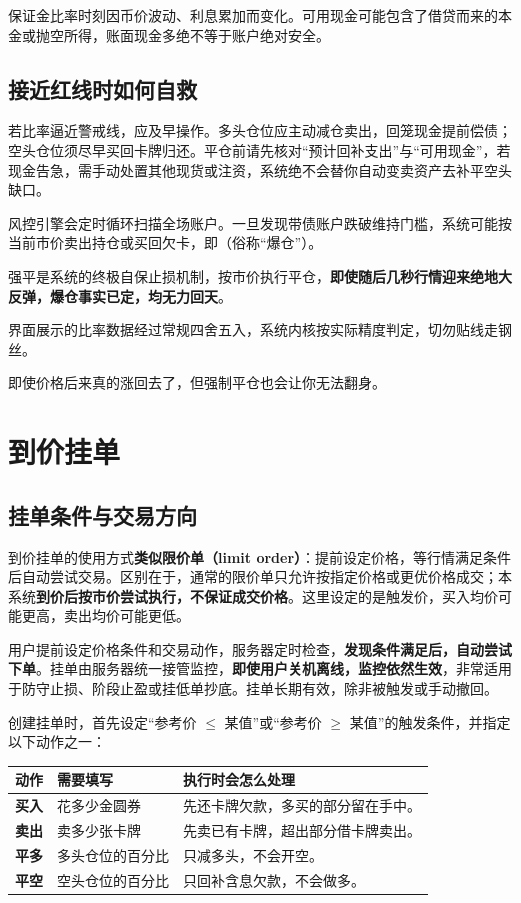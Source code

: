 \documentclass[11pt,a4paper,twoside]{article}
\newcommand{\gold}{金圆券}
\begin{document}
保证金比率时刻因币价波动、利息累加而变化。可用现金可能包含了借贷而来的本金或抛空所得，账面现金多绝不等于账户绝对安全。

\subsection{接近红线时如何自救}

若比率逼近警戒线，应及早操作。多头仓位应主动减仓卖出，回笼现金提前偿债；空头仓位须尽早买回卡牌归还。平仓前请先核对“预计回补支出”与“可用现金”，若现金告急，需手动处置其他现货或注资，系统绝不会替你自动变卖资产去补平空头缺口。

风控引擎会定时循环扫描全场账户。一旦发现带债账户跌破维持门槛，系统可能按当前市价卖出持仓或买回欠卡，即（俗称“爆仓”）。

强平是系统的终极自保止损机制，按市价执行平仓，\textbf{即使随后几秒行情迎来绝地大反弹，爆仓事实已定，均无力回天}。

界面展示的比率数据经过常规四舍五入，系统内核按实际精度判定，切勿贴线走钢丝。

\begin{lorebox}
即使价格后来真的涨回去了，但强制平仓也会让你无法翻身。
\end{lorebox}

\section{到价挂单}

\subsection{挂单条件与交易方向}

到价挂单的使用方式\textbf{类似限价单（limit order）}：提前设定价格，等行情满足条件后自动尝试交易。区别在于，通常的限价单只允许按指定价格或更优价格成交；本系统\textbf{到价后按市价尝试执行，不保证成交价格}。这里设定的是触发价，买入均价可能更高，卖出均价可能更低。

用户提前设定价格条件和交易动作，服务器定时检查，\textbf{发现条件满足后，自动尝试下单}。挂单由服务器统一接管监控，\textbf{即使用户关机离线，监控依然生效}，非常适用于防守止损、阶段止盈或挂低单抄底。挂单长期有效，除非被触发或手动撤回。

创建挂单时，首先设定“参考价 $\le$ 某值”或“参考价 $\ge$ 某值”的触发条件，并指定以下动作之一：
\begin{tabularx}{\linewidth}{@{}>{\bfseries}l XX@{}}
\toprule
\rowcolor{lightGray}
动作 & 需要填写 & 执行时会怎么处理 \\
\midrule
买入 & 花多少\gold{} & 先还卡牌欠款，多买的部分留在手中。\\
卖出 & 卖多少张卡牌 & 先卖已有卡牌，超出部分借卡牌卖出。\\
平多 & 多头仓位的百分比 & 只减多头，不会开空。\\
平空 & 空头仓位的百分比 & 只回补含息欠款，不会做多。\\
\bottomrule
\end{tabularx}
\end{document}
